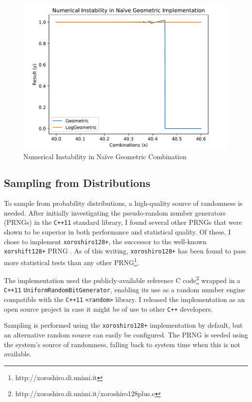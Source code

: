 \documentclass[12pt,a4paper,twoside,openright]{report}
\begin{document}
\begin{figure}[H]
\centering
\includegraphics[width=400pt]{figs/instability.pdf}
\caption{Numerical Instability in Naïve Geometric Combination}
\label{fig:num-instab}
\end{figure}

\subsection{Sampling from Distributions}

To sample from probability distributions, a high-quality source of randomness is
needed. After initially investigating the pseudo-random number generators
(PRNGs) in the \texttt{C++11} standard library, I found several other PRNGs that
were shown to be superior in both performance and statistical quality. Of these,
I chose to implement \texttt{xoroshiro128+}, the successor to the well-known
\texttt{xorshift128+} PRNG \cite{vigna2017further}.  As of this writing,
\texttt{xoroshiro128+} has been found to pass more statistical tests than any
other PRNG\footnote{http://xoroshiro.di.unimi.it}. 

The implementation used the publicly-available reference C
code\footnote{http://xoroshiro.di.unimi.it/xoroshiro128plus.c} wrapped in a
\texttt{C++11} \texttt{UniformRandomBitGenerator}, enabling its use as a random
number engine compatible with the \texttt{C++11} \texttt{<random>} library. I
released the implementation as an open source project in case it might be of use
to other \texttt{C++} developers.

Sampling is performed using the \texttt{xoroshiro128+} implementation by
default, but an alternative random source can easily be configured. The PRNG is
seeded using the system's source of randomness, falling back to system time when
this is not available.
\end{document}
